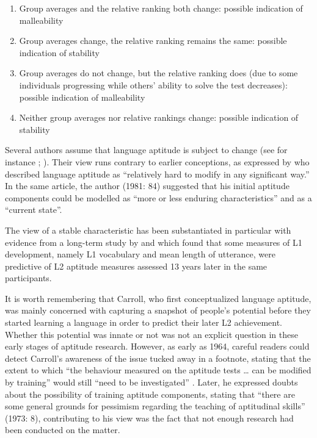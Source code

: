 \documentclass[output=paper]{langsci/langscibook}
\begin{document}
\begin{enumerate}
\item Group averages and the relative ranking both change: possible indication of malleability
\item Group averages change, the relative ranking remains the same: possible indication of stability
\item Group averages do not change, but the relative ranking does (due to some individuals progressing while others’ ability to solve the test decreases): possible indication of malleability
\item Neither group averages nor relative rankings change: possible indication of stability
\end{enumerate}

Several authors assume that language aptitude is subject to change (see for instance \citealt{GrigorenkoEtAl2000}; \citealt{Singleton2017}). Their view runs contrary to earlier conceptions, as expressed by \citet[86]{Carroll1981} who described language aptitude as “relatively hard to modify in any significant way.” In the same article, the author (1981: 84) suggested that his initial aptitude components could be modelled as “more or less enduring characteristics” and as a “current state”.  

The view of a stable characteristic has been substantiated in particular with evidence from a long-term study by \citet{Skehan1986} and \citet{SkehanDucroquet1988} which found that some measures of L1 development, namely L1 vocabulary and mean length of utterance,  were predictive of L2 aptitude measures assessed 13 years later in the same participants.

It is worth remembering that Carroll, who first conceptualized language aptitude, was mainly concerned with capturing a snapshot of people’s potential before they started learning a language in order to predict their later L2 achievement. Whether this potential was innate or not was not an explicit question in these early stages of aptitude research. However, as early as 1964, careful readers could detect Carroll’s awareness of the issue tucked away in a footnote, stating that the extent to which “the behaviour measured on the aptitude tests … can be modified by training” would still “need to be investigated” \citep[89]{Carroll1964}. Later, he expressed doubts about the possibility of training aptitude components, stating that “there are some general grounds for pessimism regarding the teaching of aptitudinal skills” (1973: 8), contributing to his view was the fact that not enough research had been conducted on the matter. 
\end{document}
